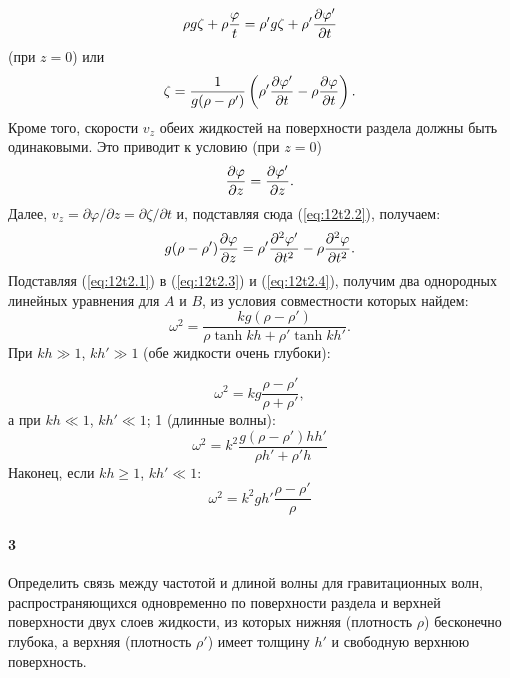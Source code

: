 \[
   \rho g \zeta + \rho \frac{\varphi}{t} = \rho' g\zeta + \rho'\frac{\partial{\varphi'}}{\partial{t}}
\]
(при $z = 0$) или
\begin{equation}
\label{eq:12t2.2}
   \zeta = \frac1{g(\rho - \rho')}\left( \rho'\frac{\partial{\varphi'}}{\partial{t}} - \rho\frac{\partial{\varphi}}{\partial{t}} \right) .
\end{equation}
Кроме того, скорости $v_z$ обеих жидкостей на поверхности раздела должны быть
одинаковыми. Это приводит к условию (при $z = 0$)
\begin{equation}
\label{eq:12t2.3}
   \frac{\partial{\varphi}}{\partial{z}} = \frac{\partial{\varphi'}}{\partial{z}}.
\end{equation}
Далее, $v_z = \partial \varphi/\partial z = \partial \zeta/\partial t$ и,
подставляя сюда (\ref{eq:12t2.2}), получаем:
\begin{equation}
\label{eq:12t2.4}
   g(\rho - \rho')\frac{\partial{\varphi}}{\partial{z}} = \rho' \frac{\partial{^2\varphi'}}{\partial{t^2}} - \rho\frac{\partial{^2\varphi}}{\partial{t^2}}.
\end{equation}
Подставляя (\ref{eq:12t2.1}) в (\ref{eq:12t2.3}) и (\ref{eq:12t2.4}), получим два однородных линейных уравнения для $A$ и
$B$, из условия совместности которых найдем:
\[
   \omega^2 = \frac{kg(\rho - \rho')}{\rho \tanh kh + \rho' \tanh kh'}.
\]
При $kh \gg 1$, $kh' \gg 1$ (обе жидкости очень глубоки):

\[
   \omega^2 = kg \frac{\rho - \rho'}{\rho + \rho'},
\]
а при $kh \ll 1$, $kh' \ll 1$; 1 (длинные волны):
\[
   \omega^2 = k^2 \frac{g(\rho - \rho')hh'}{\rho h' + \rho' h}
\]
Наконец, если $kh \geq 1$, $kh' \ll 1$:
\[
   \omega^2 = k^2 gh'\frac{\rho - \rho'}{\rho}
\]



\paragraph*{3} Определить связь между частотой и длиной волны для гравитационных
волн, распространяющихся одновременно по поверхности раздела и верхней
поверхности двух слоев жидкости, из которых нижняя (плотность $\rho$) бесконечно
глубока, а верхняя (плотность $\rho'$) имеет толщину $h'$ и свободную верхнюю
поверхность.

